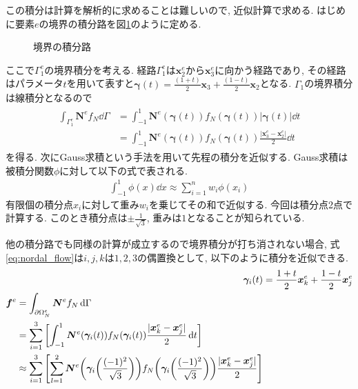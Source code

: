 \documentclass{ltjsarticle}
\begin{document}
この積分は計算を解析的に求めることは難しいので, 近似計算で求める.
はじめに要素$e$の境界の積分路を図\ref{fig:element_edges}のように定める.
\begin{figure}[htbp]
    \centering
  \caption{境界の積分路}
  \label{fig:element_edges}
\end{figure}
ここで$\Gamma^e_1$の境界積分を考える.
経路$\Gamma^e_1$は$\bm{x}^e_2$から$\bm{x}^e_3$に向かう経路であり,
その経路はパラメータ$t$を用いて表すと$\bm{\gamma}(t) = \frac{(1+t)}{2}\bm{x}_3 + \frac{(1-t)}{2}\bm{x}_2$となる.
$\Gamma_1$の境界積分は線積分となるので
\begin{align}
    \begin{split}
        \int_{\Gamma^e_1}\bm{N}^e f_N\dd{\Gamma}
        &= \int_{-1}^1 \bm{N}^e(\bm{\gamma}(t))f_N(\bm{\gamma}(t))|\bm{\gamma}(t)|\dd{t} \\
        &= \int_{-1}^1 \bm{N}^e(\bm{\gamma}(t))f_N(\bm{\gamma}(t))\frac{|\bm{x}^e_3-\bm{x}^e_2|}{2}\dd{t}
    \end{split}
\end{align}
を得る.
次にGauss求積という手法を用いて先程の積分を近似する.
Gauss求積は被積分関数$\phi$に対して以下の式で表される.
\begin{align}
    \int_{-1}^1\phi(x)\dd{x}\approx\sum_{i=1}^n w_i\phi(x_i)
\end{align}
有限個の積分点$x_i$に対して重み$w_i$を乗じてその和で近似する.
今回は積分点2点で計算する.
このとき積分点は$\pm\frac{1}{\sqrt{3}}$, 重みは$1$となることが知られている\cite{Yasuda2008}.

他の積分路でも同様の計算が成立するので境界積分が打ち消されない場合,
式\eqref{eq:nordal_flow}は$i,j,k$は$1,2,3$の偶置換として, 以下のように積分を近似できる.
\begin{align}
    \bm{\gamma}_i(t) &= \frac{1+t}{2}\bm{x}^e_k+\frac{1-t}{2}\bm{x}^e_j \\
    \begin{split}
        \bm{f}^e &=\int_{\partial\Omega^e_N}\bm{N}^e f_N\dd{\Gamma} \\
        &= \sum_{i=1}^3 \qty[\int_{-1}^1 \bm{N}^e(\bm{\gamma}_i(t))f_N(\bm{\gamma}_i(t))\frac{|\bm{x}^e_k-\bm{x}^e_j|}{2}\dd{t}] \\
        &\approx\sum_{i=1}^3\qty[\sum_{l=1}^2\bm{N}^e\qty(\bm{\gamma}_i\qty(\frac{(-1)^2}{\sqrt{3}}))f_N\qty(\bm{\gamma}_i\qty(\frac{(-1)^2}{\sqrt{3}}))\frac{|\bm{x}^e_k-\bm{x}^e_j|}{2}]
    \end{split}
\end{align}
\end{document}
